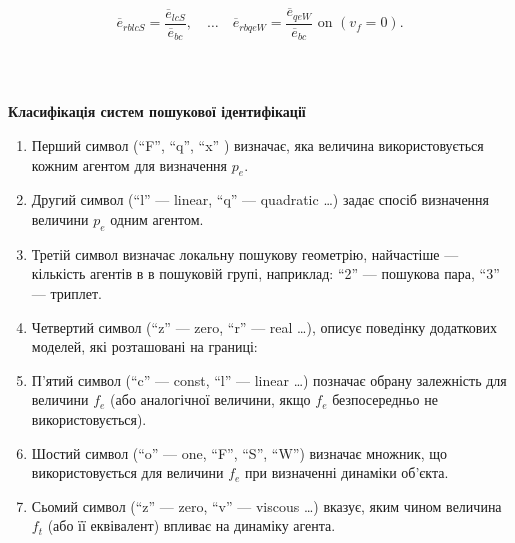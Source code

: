 \documentclass[14pt,handout,utf8]{beamer}
\newcommand{\Xhead}[1]{
 \begin{center}%
      \textbf{#1}%
 \end{center}%
}
\begin{document}
\begin{frame}
\begin{equation}
  \overline{e}_{rblcS} = \frac{\overline{e}_{lcS}}{\overline{e}_{bc}},
  \quad \ldots \quad
  \overline{e}_{rbqeW} = \frac{\overline{e}_{qeW}}{\overline{e}_{bc}} \text{ on }  (v_f=0) .
  \label{atu:eq:e_rbxx}
\end{equation}


\end{frame}



\begin{frame}
  \frametitle{~}

  \Xhead{Класифікація систем пошукової ідентифікації}

  {\small
  \begin{enumerate}

    \item
      Перший символ (``F'', ``q'', ``x'' ) визначає,
      яка величина використовується кожним агентом для визначення $p_e$.

    \item
      Другий символ (``l'' --- linear, ``q'' --- quadratic \ldots ) 
      задає спосіб визначення величини $p_e$ одним агентом.

    \item
      Третій символ визначає локальну пошукову геометрію, найчастіше --- кількість
      агентів в в пошуковій групі, наприклад: ``2'' --- пошукова пара, ``3'' --- триплет.

    \item
      Четвертий символ (``z'' --- zero, ``r'' --- real \ldots),
      описує поведінку додаткових моделей, які розташовані на границі:

    \item
      П'ятий символ (``c'' --- const, ``l'' --- linear \ldots )
      позначає обрану залежність для величини $f_e$ (або
      аналогічної величини, якщо $f_e$ безпосередньо не використовується).

    \item
      Шостий символ (``o'' --- one, ``F'', ``S'', ``W'') визначає множник,
      що використовується для величини $f_e$ при визначенні динаміки об'єкта.

    \item
      Сьомий символ (``z'' --- zero, ``v'' --- viscous \ldots)
      вказує, яким чином величина $f_t$ (або її еквівалент) впливає на динаміку агента.


\end{enumerate}}
\end{frame}
\end{document}

